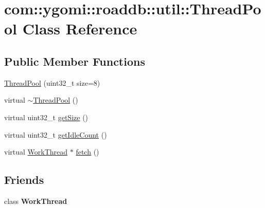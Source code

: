 \hypertarget{classcom_1_1ygomi_1_1roaddb_1_1util_1_1ThreadPool}{\section{com\-:\-:ygomi\-:\-:roaddb\-:\-:util\-:\-:Thread\-Pool Class Reference}
\label{classcom_1_1ygomi_1_1roaddb_1_1util_1_1ThreadPool}
}
\subsection*{Public Member Functions}
\begin{DoxyCompactItemize}
\item 
\hyperlink{classcom_1_1ygomi_1_1roaddb_1_1util_1_1ThreadPool_ac08fb558f6e484ebbf680d94104009d4}{Thread\-Pool} (uint32\-\_\-t size=8)
\item 
virtual \hyperlink{classcom_1_1ygomi_1_1roaddb_1_1util_1_1ThreadPool_a8d99bb4e9986d3c817d0c8781da80e22}{$\sim$\-Thread\-Pool} ()
\item 
virtual uint32\-\_\-t \hyperlink{classcom_1_1ygomi_1_1roaddb_1_1util_1_1ThreadPool_a70ba5922908b606d2a0b24da904566fb}{get\-Size} ()
\item 
virtual uint32\-\_\-t \hyperlink{classcom_1_1ygomi_1_1roaddb_1_1util_1_1ThreadPool_aa3955a1e2512c96535f137a6bc72aec0}{get\-Idle\-Count} ()
\item 
virtual \hyperlink{classcom_1_1ygomi_1_1roaddb_1_1util_1_1WorkThread}{Work\-Thread} $\ast$ \hyperlink{classcom_1_1ygomi_1_1roaddb_1_1util_1_1ThreadPool_a042c27046d92f2e389e77fe52d4dc0d2}{fetch} ()
\end{DoxyCompactItemize}
\subsection*{Friends}
\begin{DoxyCompactItemize}
\item 
\hypertarget{classcom_1_1ygomi_1_1roaddb_1_1util_1_1ThreadPool_a47faa4de4512428060e1fe5c768b4d47}{class {\bfseries Work\-Thread}}\label{classcom_1_1ygomi_1_1roaddb_1_1util_1_1ThreadPool_a47faa4de4512428060e1fe5c768b4d47}

\end{DoxyCompactItemize}


